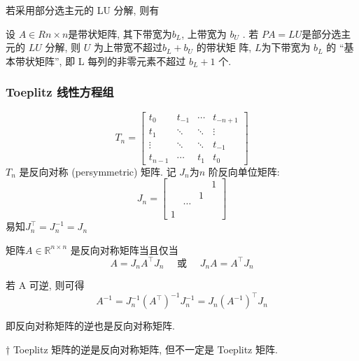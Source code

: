 \documentclass[12pt,a4paper]{article}
\begin{document}
若采用部分选主元的 LU 分解, 则有

\begin{theorem}
	设 $A ∈ R
	n×n $是带状矩阵, 其下带宽为$ b_L$, 上带宽为 $b_U$ . 若 $P A =
	LU $是部分选主元的 $LU$ 分解, 则 $U$ 为上带宽不超过$b_L + b_U$ 的带状矩
	阵, $L $为下带宽为 $b_L$ 的 “基本带状矩阵”, 即 L 每列的非零元素不超过
	$b_L + 1$ 个.
\end{theorem}


\subsubsection{Toeplitz 线性方程组}
\begin{equation}
T_{n}=\left[\begin{array}{cccc}{t_{0}} & {t_{-1}} & {\cdots} & {t_{-n+1}} \\ {t_{1}} & {\ddots} & {\ddots} & {\vdots} \\ {\vdots} & {\ddots} & {\ddots} & {t_{-1}} \\ {t_{n-1}} & {\cdots} & {t_{1}} & {t_{0}}\end{array}\right]
\end{equation}
$T_n$ 是反向对称 (persymmetric) 矩阵. 记 $J_n $为$ n$ 阶反向单位矩阵:
\begin{equation}
J_{n}=\left[\begin{array}{cccc}{ } & { } & { } &{1} \\{ } & { } &{1} & { } \\ {} & {\cdots}& { } & { } \\ {1} &{ } &{ } &{ }\end{array}\right]
\end{equation}
易知$J_{n}^{\top}=J_{n}^{-1}=J_{n}$


\begin{lemma}
	矩阵$ A ∈ \mathbb{R}^{n×n}$ 是反向对称矩阵当且仅当
	\begin{equation}
	A=J_{n} A^{\top} J_{n} \quad \text { 或 } \quad J_{n} A=A^{\top} J_{n}
	\end{equation}
\end{lemma}


若 A 可逆, 则可得
\begin{equation}
A^{-1}=J_{n}^{-1}\left(A^{\top}\right)^{-1} J_{n}^{-1}=J_{n}\left(A^{-1}\right)^{\top} J_{n}
\end{equation}

即反向对称矩阵的逆也是反向对称矩阵.

† Toeplitz 矩阵的逆是反向对称矩阵, 但不一定是 Toeplitz 矩阵.
\end{document}

